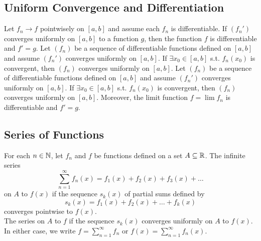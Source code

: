 \documentclass[11pt]{article}
\begin{document}
\subsection{Uniform Convergence and Differentiation}
 Let $f_n \rightarrow f$ pointwisely on $[a,b]$ and assume each $f_n$ is differentiable. If $(f_n')$ converges uniformly on $[a,b]$ to a function $g$, then the function $f$ is differentiable and $f' = g$.
\theorem Let $(f_n)$ be a sequence of differentiable functions defined on $[a,b]$ and assume $(f_n')$ converges uniformly on $[a,b]$. If $\exists x_0 \in [a,b]$ s.t. $f_n(x_0)$ is convergent, then $(f_n)$ converges uniformly on $[a,b]$.
\theorem Let $(f_n)$ be a sequence of differentiable functions defined on $[a,b]$ and assume $(f_n')$ converges uniformly on $[a,b]$. If $\exists x_0 \in [a,b]$ s.t. $f_n(x_0)$ is convergent, then $(f_n)$ converges uniformly on $[a,b]$. Moreover, the limit function $f = \lim f_n$ is differentiable and $f' = g$.


\subsection{Series of Functions}

 For each $n \in \mathbb{N}$, let $f_n$ and $f$ be functions defined on a set $A \subseteq \mathbb{R}$. The infinite series
$$\sum_{n=1}^\infty f_n(x) = f_1(x) + f_2(x) + f_3(x) + \hdots$$
 on $A$ to $f(x)$ if the sequence $s_k(x)$ of partial sums defined by
$$s_k(x) = f_1(x) + f_2(x) + \hdots + f_k(x)$$
converges pointwise to $f(x)$. \\
The series  on $A$ to $f$ if the sequence $s_k(x)$ converges uniformly on $A$ to $f(x)$.\\
In either case, we write $f = \sum_{n=1}^\infty f_n$ or $f(x) = \sum_{n=1}^\infty f_n(x)$.
\end{document}
